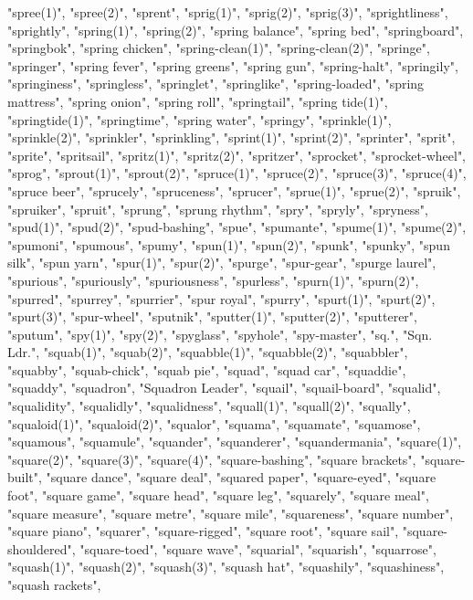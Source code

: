 "spree(1)",
"spree(2)",
"sprent",
"sprig(1)",
"sprig(2)",
"sprig(3)",
"sprightliness",
"sprightly",
"spring(1)",
"spring(2)",
"spring balance",
"spring bed",
"springboard",
"springbok",
"spring chicken",
"spring-clean(1)",
"spring-clean(2)",
"springe",
"springer",
"spring fever",
"spring greens",
"spring gun",
"spring-halt",
"springily",
"springiness",
"springless",
"springlet",
"springlike",
"spring-loaded",
"spring mattress",
"spring onion",
"spring roll",
"springtail",
"spring tide(1)",
"springtide(1)",
"springtime",
"spring water",
"springy",
"sprinkle(1)",
"sprinkle(2)",
"sprinkler",
"sprinkling",
"sprint(1)",
"sprint(2)",
"sprinter",
"sprit",
"sprite",
"spritsail",
"spritz(1)",
"spritz(2)",
"spritzer",
"sprocket",
"sprocket-wheel",
"sprog",
"sprout(1)",
"sprout(2)",
"spruce(1)",
"spruce(2)",
"spruce(3)",
"spruce(4)",
"spruce beer",
"sprucely",
"spruceness",
"sprucer",
"sprue(1)",
"sprue(2)",
"spruik",
"spruiker",
"spruit",
"sprung",
"sprung rhythm",
"spry",
"spryly",
"spryness",
"spud(1)",
"spud(2)",
"spud-bashing",
"spue",
"spumante",
"spume(1)",
"spume(2)",
"spumoni",
"spumous",
"spumy",
"spun(1)",
"spun(2)",
"spunk",
"spunky",
"spun silk",
"spun yarn",
"spur(1)",
"spur(2)",
"spurge",
"spur-gear",
"spurge laurel",
"spurious",
"spuriously",
"spuriousness",
"spurless",
"spurn(1)",
"spurn(2)",
"spurred",
"spurrey",
"spurrier",
"spur royal",
"spurry",
"spurt(1)",
"spurt(2)",
"spurt(3)",
"spur-wheel",
"sputnik",
"sputter(1)",
"sputter(2)",
"sputterer",
"sputum",
"spy(1)",
"spy(2)",
"spyglass",
"spyhole",
"spy-master",
"sq.",
"Sqn. Ldr.",
"squab(1)",
"squab(2)",
"squabble(1)",
"squabble(2)",
"squabbler",
"squabby",
"squab-chick",
"squab pie",
"squad",
"squad car",
"squaddie",
"squaddy",
"squadron",
"Squadron Leader",
"squail",
"squail-board",
"squalid",
"squalidity",
"squalidly",
"squalidness",
"squall(1)",
"squall(2)",
"squally",
"squaloid(1)",
"squaloid(2)",
"squalor",
"squama",
"squamate",
"squamose",
"squamous",
"squamule",
"squander",
"squanderer",
"squandermania",
"square(1)",
"square(2)",
"square(3)",
"square(4)",
"square-bashing",
"square brackets",
"square-built",
"square dance",
"square deal",
"squared paper",
"square-eyed",
"square foot",
"square game",
"square head",
"square leg",
"squarely",
"square meal",
"square measure",
"square metre",
"square mile",
"squareness",
"square number",
"square piano",
"squarer",
"square-rigged",
"square root",
"square sail",
"square-shouldered",
"square-toed",
"square wave",
"squarial",
"squarish",
"squarrose",
"squash(1)",
"squash(2)",
"squash(3)",
"squash hat",
"squashily",
"squashiness",
"squash rackets",
